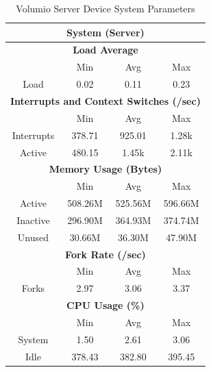 \documentclass[11pt,a4paper]{scrreprt}
\begin{document}
\begin{table}[H]
\centering
    \begin{tabular}{||c|c|c|c|c|c|c||}
    \hline
    \multicolumn{7}{|c|}{\textbf{System (Server)}} \\
    \hline
    \multicolumn{7}{|c|}{\textbf{Load Average}} \\
    \hline\hline
      & \multicolumn{2}{|c|}{Min} & \multicolumn{2}{|c|}{Avg} & \multicolumn{2}{|c|}{Max} \\
    \hline
    Load & \multicolumn{2}{|c|}{0.02} & \multicolumn{2}{|c|}{0.11} & \multicolumn{2}{|c|}{0.23} \\
    \hline\hline
    \multicolumn{7}{|c|}{\textbf{Interrupts and Context Switches (/sec)}} \\
    \hline
      & \multicolumn{2}{|c|}{Min} & \multicolumn{2}{|c|}{Avg} & \multicolumn{2}{|c|}{Max} \\
    \hline
    Interrupts & \multicolumn{2}{|c|}{378.71} & \multicolumn{2}{|c|}{925.01} & \multicolumn{2}{|c|}{1.28k} \\
    \hline
    Active & \multicolumn{2}{|c|}{480.15} & \multicolumn{2}{|c|}{1.45k} & \multicolumn{2}{|c|}{2.11k} \\
    \hline\hline
    \multicolumn{7}{|c|}{\textbf{Memory Usage (Bytes)}} \\
    \hline\hline
      & \multicolumn{2}{|c|}{Min} & \multicolumn{2}{|c|}{Avg} & \multicolumn{2}{|c|}{Max} \\
    \hline
    Active & \multicolumn{2}{|c|}{508.26M} & \multicolumn{2}{|c|}{525.56M} & \multicolumn{2}{|c|}{596.66M} \\
    \hline
    Inactive & \multicolumn{2}{|c|}{296.90M} & \multicolumn{2}{|c|}{364.93M} & \multicolumn{2}{|c|}{374.74M} \\
    \hline
    Unused & \multicolumn{2}{|c|}{30.66M} & \multicolumn{2}{|c|}{36.30M} & \multicolumn{2}{|c|}{47.90M} \\
    \hline\hline
    \multicolumn{7}{|c|}{\textbf{Fork Rate (/sec)}} \\
    \hline\hline
      & \multicolumn{2}{|c|}{Min} & \multicolumn{2}{|c|}{Avg} & \multicolumn{2}{|c|}{Max} \\
    \hline
    Forks & \multicolumn{2}{|c|}{2.97} & \multicolumn{2}{|c|}{3.06} & \multicolumn{2}{|c|}{3.37} \\
    \hline\hline
    \multicolumn{7}{|c|}{\textbf{CPU Usage (\%)}} \\
    \hline\hline
      & \multicolumn{2}{|c|}{Min} & \multicolumn{2}{|c|}{Avg} & \multicolumn{2}{|c|}{Max} \\
    \hline
    System & \multicolumn{2}{|c|}{1.50} & \multicolumn{2}{|c|}{2.61} & \multicolumn{2}{|c|}{3.06} \\
    \hline
    Idle & \multicolumn{2}{|c|}{378.43} & \multicolumn{2}{|c|}{382.80} & \multicolumn{2}{|c|}{395.45} \\
    \hline\hline
    \end{tabular}
    \caption{Volumio Server Device System Parameters}
    \label{VolumioserverSysTab}
\end{table}
\end{document}
